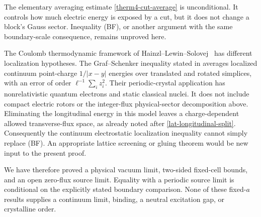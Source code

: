 The elementary averaging estimate \eqref{therm4-cut-average} is
unconditional.  It controls how much electric energy is exposed by
a cut, but it does not change a block's Gauss sector.  Inequality
(BF), or another argument with the same boundary-scale consequence,
remains unproved here.

The Coulomb thermodynamic framework of
Hainzl--Lewin--Solovej~\cite{HLSThermoI,HLSThermoII} has different
localization hypotheses. The Graf--Schenker inequality stated in
\cite[Theorem~2]{HLSThermoII} averages localized continuum point-charge
$1/|x-y|$ energies over translated and rotated simplices, with an
error of order $\ell^{-1}\sum_i z_i^2$.  Their periodic-crystal
application has nonrelativistic quantum electrons and static
classical nuclei.  It does not include compact electric rotors or
the integer-flux physical-sector decomposition above.  Eliminating
the longitudinal energy in this model leaves a charge-dependent
allowed transverse-flux space, as already noted after
\eqref{lat-longitudinal-split}.  Consequently the continuum
electrostatic localization inequality cannot simply replace (BF).
An appropriate lattice screening or gluing theorem would be new
input to the present proof.

We have therefore proved a physical vacuum limit, two-sided fixed-cell
bounds, and an open zero-flux source limit.  Equality with a periodic
source limit is conditional on the explicitly stated boundary
comparison.  None of these fixed-$a$ results supplies a continuum
limit, binding, a neutral excitation gap, or crystalline order.

